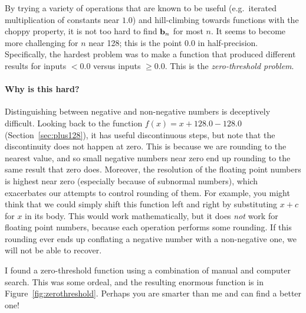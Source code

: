 \documentclass[twocolumn]{article}
\newcommand\basis{\ensuremath{\textrm{\bf b}}}
\begin{document}
By trying a variety of operations that are known to be useful
(e.g.~iterated multiplication of constants near $1.0$) and
hill-climbing towards functions with the choppy property, it is not
too hard to find $\basis_n$ for most $n$. It seems to become more
challenging for $n$ near 128; this is the point $0.0$ in
half-precision. Specifically, the hardest problem was to make a
function that produced different results for inputs $< 0.0$ versus
inputs $\geq 0.0$. This is the {\em zero-threshold problem}.


\paragraph{Why is this hard?}
Distinguishing between negative and non-negative numbers is
deceptively difficult. Looking back to the function $f(x) = x + 128.0
- 128.0$ (Section~\ref{sec:plus128}), it has useful discontinuous
steps, but note that the discontinuity does not happen at zero. This
is because we are rounding to the nearest value, and so small negative
numbers near zero end up rounding to the same result that zero does.
Moreover, the resolution of the floating point numbers is highest near
zero (especially because of subnormal numbers), which exacerbates our
attempts to control rounding of them. For example, you might think
that we could simply shift this function left and right by
substituting $x + c$ for $x$ in its body. This would work
mathematically, but it does {\em not} work for floating point numbers,
because each operation performs some rounding. If this rounding ever
ends up conflating a negative number with a non-negative one, we will
not be able to recover.

I found a zero-threshold function using a combination of manual and
computer search. This was some ordeal, and the resulting enormous
function is in Figure~\ref{fig:zerothreshold}. Perhaps you are
smarter than me and can find a better one!
\end{document}
